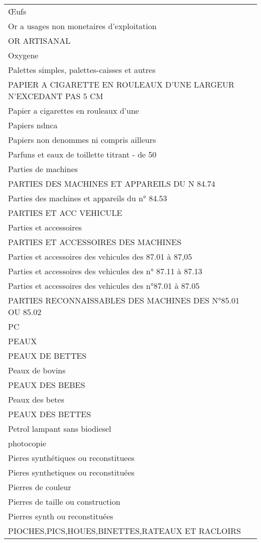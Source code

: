 \documentclass[
]{book}
\begin{document}
\begin{longtable}[t]{l}
\addlinespace
Œufs\\
Or a usages non monetaires d'exploitation\\
OR ARTISANAL\\
Oxygene\\
Palettes simples, palettes-caisses et autres\\
\addlinespace
PAPIER A CIGARETTE EN ROULEAUX D'UNE LARGEUR N'EXCEDANT PAS 5 CM\\
Papier a cigarettes en rouleaux d'une\\
Papiers ndnca\\
Papiers non denommes ni compris ailleurs\\
Parfuns et eaux de toillette titrant - de 50\\
\addlinespace
Parties de machines\\
PARTIES DES MACHINES ET APPAREILS DU N 84.74\\
Parties des machines et appareils du n° 84.53\\
PARTIES ET ACC VEHICULE\\
Parties et accessoires\\
\addlinespace
PARTIES ET ACCESSOIRES DES MACHINES\\
Parties et accessoires des vehicules  des 87.01 à 87,05\\
Parties et accessoires des vehicules des n° 87.11 à 87.13\\
Parties et accessoires des vehicules des n°87.01 à 87.05\\
PARTIES RECONNAISSABLES DES MACHINES DES N°85.01 OU 85.02\\
\addlinespace
PC\\
PEAUX\\
PEAUX DE BETTES\\
Peaux de bovins\\
PEAUX DES BEBES\\
\addlinespace
Peaux des betes\\
PEAUX DES BETTES\\
Petrol lampant sans biodiesel\\
photocopie\\
Pieres synthétiques ou reconstituees\\
\addlinespace
Pieres synthetiques ou reconstituées\\
Pierres de couleur\\
Pierres de taille ou construction\\
Pierres synth ou reconstituées\\
PIOCHES,PICS,HOUES,BINETTES,RATEAUX ET RACLOIRS\\

\end{longtable}
\end{document}
